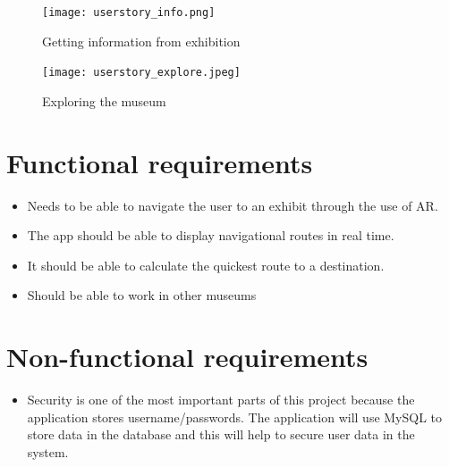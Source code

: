 \begin{figure}[H]
    \texttt{[image: userstory\_info.png]}
    \caption{Getting information from exhibition}
    \label{fig:infofromexhibit}
\end{figure}

\begin{figure}[H]
    \texttt{[image: userstory\_explore.jpeg]}
    \caption{Exploring the museum}
    \label{fig:exploring}
\end{figure}

\section{Functional requirements}
\begin{itemize}
        \item Needs to be able to navigate the user to an exhibit through the use of AR.
        \item The app should be able to display navigational routes in real time.
        \item It should be able to calculate the quickest route to a destination.
        \item Should be able to work in other museums
\end{itemize}

\section{Non-functional requirements}
\begin{itemize}
        \item Security is one of the most important parts of this project because the application stores username/passwords. The application will use MySQL to store data in the database and this will help to secure user data in the system.
\end{itemize}
    